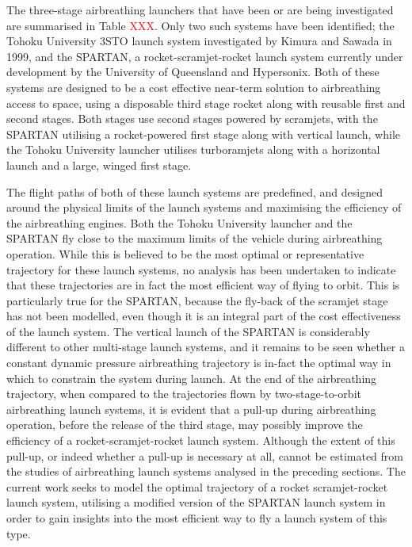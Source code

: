 The three-stage airbreathing launchers that have been or are being investigated are summarised in Table \textcolor{red}{XXX}. Only two such systems have been identified; the Tohoku University 3STO launch system investigated by Kimura and Sawada in 1999\cite{Kimura1999}, and the SPARTAN, a rocket-scramjet-rocket launch system currently under development by the University of Queensland and Hypersonix. Both of these systems are designed to be a cost effective near-term solution to airbreathing access to space, using a disposable third stage rocket along with reusable first and second stages. Both stages use second stages powered by scramjets, with the SPARTAN utilising a rocket-powered first stage along with vertical launch, while the Tohoku University launcher utilises turboramjets along with a horizontal launch and a large, winged first stage. 

 The flight paths of both of these launch systems are predefined, and designed around the physical limits of the launch systems and maximising the efficiency of the airbreathing engines. Both the Tohoku University launcher and the SPARTAN fly close to the maximum limits of the vehicle during airbreathing operation.
While this is believed to be the most optimal or representative trajectory for these launch systems, no analysis has been undertaken to indicate that these trajectories are in fact the most efficient way of flying to orbit. This is particularly true for the SPARTAN, because the fly-back of the scramjet stage has not been modelled, even though it is an integral part of the cost effectiveness of the launch system. 
The vertical launch of the SPARTAN is considerably different to other multi-stage launch systems, and it remains to be seen whether a constant dynamic pressure airbreathing trajectory is in-fact the optimal way in which to constrain the system during launch. 
At the end of the airbreathing trajectory, when compared to the trajectories flown by two-stage-to-orbit airbreathing launch systems, it is evident that a pull-up during airbreathing operation, before the release of the third stage, may possibly improve the efficiency of a rocket-scramjet-rocket launch system. Although the extent of this pull-up, or indeed whether a pull-up is necessary at all, cannot be estimated from the studies of airbreathing launch systems analysed in the preceding sections.
The current work seeks to model the optimal trajectory of a rocket scramjet-rocket launch system, utilising a modified version of the SPARTAN launch system in order to gain insights into the most efficient way to fly a launch system of this type. 



